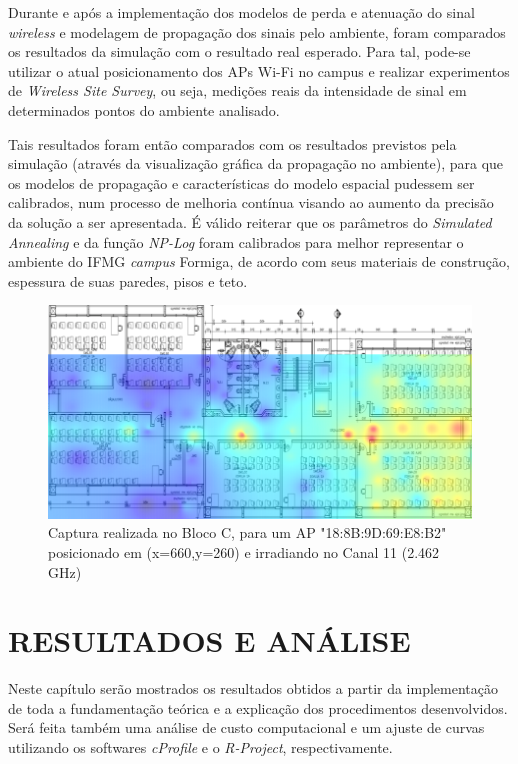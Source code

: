 \documentclass[
	12pt,				%
	openright,			%
	twoside,			%
	a4paper,			%
	english,			%
	french,				%
	spanish,			%
	brazil				%
	]{abntex2}
\begin{document}
Durante e após a implementação dos modelos de perda e atenuação do sinal \textit{wireless} e modelagem de propagação dos sinais pelo ambiente, foram comparados os resultados da simulação com o resultado real esperado. Para tal, pode-se utilizar o atual posicionamento dos APs Wi-Fi no campus e realizar experimentos de \textit{Wireless Site Survey}, ou seja, medições reais da intensidade de sinal em determinados pontos do ambiente analisado.

Tais resultados foram então comparados com os resultados previstos pela simulação (através da visualização gráfica da propagação no ambiente), para que os modelos de propagação e características do modelo espacial pudessem ser calibrados, num processo de melhoria contínua visando ao aumento da precisão da solução a ser apresentada. É válido reiterar que os parâmetros do \textit{Simulated Annealing} e da função \textit{NP-Log} foram calibrados para melhor representar o ambiente do IFMG \textit{campus} Formiga, de acordo com seus materiais de construção, espessura de suas paredes, pisos e teto. 

\begin{figure}[ht]
	\caption{\label{captura}Captura realizada no Bloco C, para um AP "18:8B:9D:69:E8:B2" posicionado em (x=660,y=260) e irradiando no Canal 11 (2.462 GHz)}
	\begin{center}
		\includegraphics[scale=0.5]{images/captura.jpg}
	\end{center}
\end{figure}


\chapter[RESULTADOS E ANÁLISE]{RESULTADOS E ANÁLISE}

Neste capítulo serão mostrados os resultados obtidos a partir da implementação de toda a fundamentação teórica e a explicação dos procedimentos desenvolvidos. Será feita também uma análise de custo computacional e um ajuste de curvas utilizando os softwares \textit{cProfile} e o \textit{R-Project}, respectivamente. 
\end{document}
